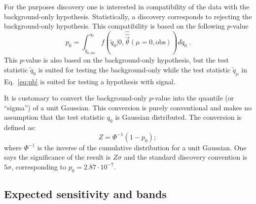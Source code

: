 For the purposes discovery one is interested in compatibility of the data with the background-only hypothesis.  Statistically, a discovery corresponds to rejecting the background-only hypothesis.  This compatibility is based on the following $p$-value
\begin{equation}
p_0=\int_{\tilde q_{0,obs}}^\infty f(\tilde q_0|0,\hat{\hat{\vec{\theta}}}(\mu=0,\textrm{obs}))d\tilde q_0 \;.
\end{equation}
This $p$-value is also based on the background-only hypothesis, but the test statistic $\tilde q_0$ is suited for testing the background-only while the test statistic $\tilde{q}_\mu$ in Eq.~\ref{eq:pb} is suited for testing a hypothesis with signal.


It is customary to convert the background-only $p$-value into the quantile (or ``sigma'') of a unit Gaussian.  This conversion is purely conventional and makes no assumption that the test statistic $q_0$ is Gaussian distributed.  The conversion is defined as:
\begin{equation}
Z = \Phi^{-1}(1-p_0) ;\,
\end{equation}
where $\Phi^{-1}$ is the inverse of the cumulative distribution for a unit Gaussian.  One says the significance of the result is $Z\sigma$ and the standard discovery convention is $5\sigma$, corresponding to $p_0=2.87  \cdot 10^{-7}$.


\subsection{Expected sensitivity and bands}


